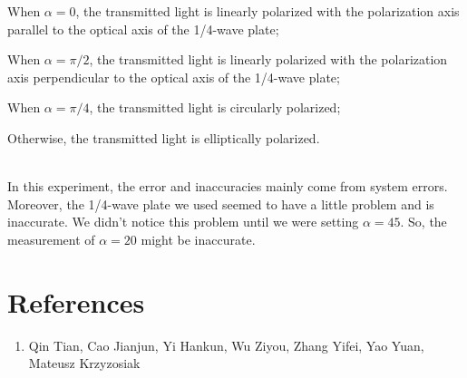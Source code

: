 \documentclass[12pt, a4paper]{article}
\begin{document}
When $ \alpha= 0 $, the transmitted light is linearly polarized with the polarization axis parallel to the optical axis of the 1/4-wave plate;

When $ \alpha=\pi/2 $, the transmitted light is linearly polarized with the polarization axis perpendicular to the optical axis of the 1/4-wave plate;

When $ \alpha=\pi/4 $, the transmitted light is circularly polarized;

Otherwise, the transmitted light is elliptically polarized.

~\\
\indent In this experiment, the error and inaccuracies mainly come from system errors. 
Moreover, the 1/4-wave plate we used seemed to have a little problem and is inaccurate. We 
didn't notice this problem until we were setting $\alpha = 45$. So, the measurement of $\alpha = 20$ 
might be inaccurate.


\section{References}
    \begin{enumerate}
        \item Qin Tian, Cao Jianjun, Yi Hankun, Wu Ziyou, Zhang Yifei, Yao Yuan, Mateusz Krzyzosiak
    \end{enumerate}
\end{document}
